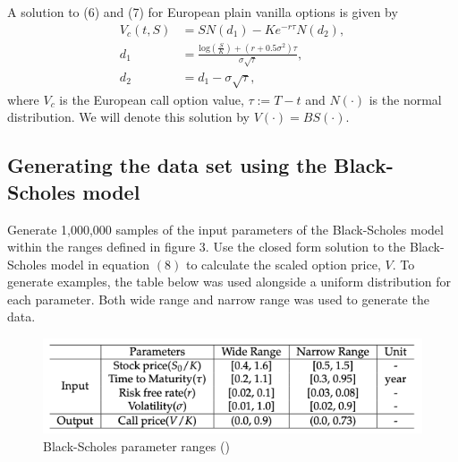 \documentclass[12pt,a4paper]{article}
\begin{document}
A solution to (6) and (7) for European plain vanilla options is given by
\begin{align}
    V_c(t,S) &= SN(d_1) - Ke^{-r\tau}N(d_2), \nonumber \\
    d_1 &= \frac{\text{log}(\frac{S}{K}) + (r + 0.5\sigma^2)\tau}{\sigma\sqrt{\tau}}, \\
    d_2 &= d_1 - \sigma\sqrt{\tau}, \nonumber
\end{align}
where $V_c$ is the European call option value, $\tau := T-t$ and $N(\cdot)$ is the normal distribution. We will denote this solution by $V(\cdot)=BS(\cdot)$.

\subsection{Generating the data set using the Black-Scholes model}
Generate 1,000,000 samples of the input parameters of the Black-Scholes model within the ranges defined in figure 3. Use the closed form solution to the Black-Scholes model in equation $(8)$ to calculate the scaled option price, $V$. To generate examples, the table below was used alongside a uniform distribution for each parameter. Both wide range and narrow range was used to generate the data.

\begin{figure}[H]
    \centering
    \includegraphics[width=370pt]{Black-Scholes parameter ranges.png}
    \caption{Black-Scholes parameter ranges (\cite{risks7010016})}
\end{figure}
\end{document}
